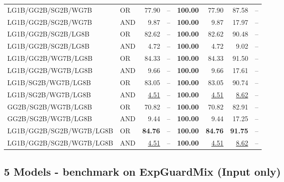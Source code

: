 \documentclass{article}
\begin{document}
{\begin{longtable}{llrrrrrr}
 LG1B/GG2B/SG2B/WG7B      & OR      & 77.90            & --            & \textbf{100.00} & 77.90            & 87.58            & --    \\
 LG1B/GG2B/SG2B/WG7B      & AND     & 9.87             & --            & \textbf{100.00} & 9.87             & 17.97            & --    \\
 LG1B/GG2B/SG2B/LG8B      & OR      & 82.62            & --            & \textbf{100.00} & 82.62            & 90.48            & --    \\
 LG1B/GG2B/SG2B/LG8B      & AND     & 4.72             & --            & \textbf{100.00} & 4.72             & 9.02             & --    \\
 LG1B/GG2B/WG7B/LG8B      & OR      & 84.33            & --            & \textbf{100.00} & 84.33            & 91.50            & --    \\
 LG1B/GG2B/WG7B/LG8B      & AND     & 9.66             & --            & \textbf{100.00} & 9.66             & 17.61            & --    \\
 LG1B/SG2B/WG7B/LG8B      & OR      & 83.05            & --            & \textbf{100.00} & 83.05            & 90.74            & --    \\
 LG1B/SG2B/WG7B/LG8B      & AND     & \underline{4.51} & --            & \textbf{100.00} & \underline{4.51} & \underline{8.62} & --    \\
 GG2B/SG2B/WG7B/LG8B      & OR      & 70.82            & --            & \textbf{100.00} & 70.82            & 82.91            & --    \\
 GG2B/SG2B/WG7B/LG8B      & AND     & 9.44             & --            & \textbf{100.00} & 9.44             & 17.25            & --    \\
 LG1B/GG2B/SG2B/WG7B/LG8B & OR      & \textbf{84.76}   & --            & \textbf{100.00} & \textbf{84.76}   & \textbf{91.75}   & --    \\
 LG1B/GG2B/SG2B/WG7B/LG8B & AND     & \underline{4.51} & --            & \textbf{100.00} & \underline{4.51} & \underline{8.62} & --    \\

\end{longtable}
}


\subsection{5 Models - benchmark on ExpGuardMix (Input only)}
\end{document}
